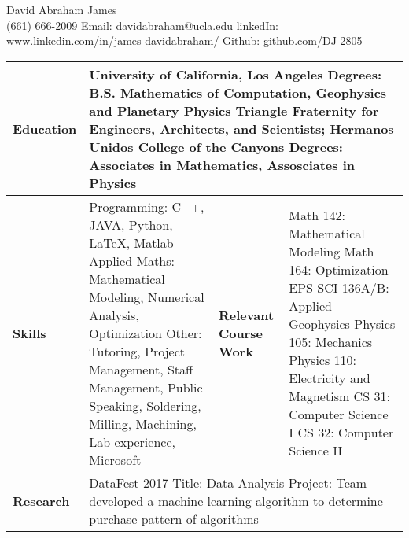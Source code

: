 \documentclass[10pt]{article}
\begin{document}

\begin{center}
    David Abraham James \\
    (661) 666-2009 Email: davidabraham@ucla.edu linkedIn: www.linkedin.com/in/james-davidabraham/ Github: github.com/DJ-2805
\end{center}

\begin{tabular}{l l l l} \hline
    \multicolumn{1}{p{1.5cm}}{\textbf{Education}}    &                
        \multicolumn{3}{p{17cm}}{University of California, Los Angeles \newline
        Degrees: B.S. Mathematics of Computation, Geophysics and Planetary Physics \newline
        Triangle Fraternity for Engineers, Architects, and Scientists; Hermanos Unidos \newline
        College of the Canyons \newline
        Degrees: Associates in Mathematics, Assosciates in Physics} \\ \hline
    \multicolumn{1}{p{1.5cm}}{\textbf{Skills}}   &
        \multicolumn{1}{p{8cm}}{Programming: C++, JAVA, Python, \LaTeX, Matlab \newline
        Applied Maths: Mathematical Modeling, Numerical Analysis, Optimization \newline
        Other: Tutoring, Project Management, Staff Management, Public Speaking, Soldering, Milling, Machining, Lab experience, Microsoft}  &
            \multicolumn{1}{p{1.5cm}}{\textbf{Relevant Course Work}} &
                \multicolumn{1}{p{6cm}}{Math 142: Mathematical Modeling \newline
                Math 164: Optimization \newline
                EPS SCI 136A/B: Applied Geophysics
                Physics 105: Mechanics \newline
                Physics 110: Electricity and Magnetism \newline
                CS 31: Computer Science I \newline
                CS 32: Computer Science II} \\ \hline
    \multicolumn{1}{p{1.5cm}}{\textbf{Research}} &
        \multicolumn{3}{p{16cm}}{
        DataFest 2017 \newline
        Title: Data Analysis \newline
        Project: Team developed a machine learning algorithm to determine purchase pattern of algorithms
}
\end{tabular}
\end{document}
